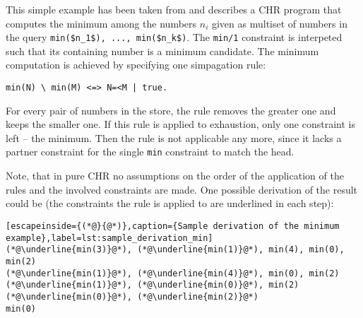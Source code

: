 \begin{example}[Minimum]
\label{ex:minimum}

This simple example has been taken from \cite[19\psqq]{fru_chr_book_2009} and describes a CHR program that computes the minimum among the numbers $n_i$ given as multiset of numbers in the query \lstinline[mathescape]|min($n_1$), ..., min($n_k$)|. The \lstinline|min/1| constraint is interpeted such that its containing number is a minimum candidate. The minimum computation is achieved by specifying one simpagation rule:

\begin{lstlisting}[caption={Minimum program}]
min(N) \ min(M) <=> N=<M | true.
\end{lstlisting}

For every pair of numbers in the store, the rule removes the greater one and keeps the smaller one. If this rule is applied to exhaustion, only one constraint is left -- the minimum. Then the rule is not applicable any more, since it lacks a partner constraint for the single \lstinline|min| constraint to match the head.

Note, that in pure CHR no assumptions on the order of the application of the rules and the involved constraints are made. One possible derivation of the result could be (the constraints the rule is applied to are underlined in each step):

\begin{lstlisting}[escapeinside={(*@}{@*)},caption={Sample derivation of the minimum example},label=lst:sample_derivation_min]
(*@\underline{min(3)}@*), (*@\underline{min(1)}@*), min(4), min(0), min(2)
(*@\underline{min(1)}@*), (*@\underline{min(4)}@*), min(0), min(2)
(*@\underline{min(1)}@*), (*@\underline{min(0)}@*), min(2)
(*@\underline{min(0)}@*), (*@\underline{min(2)}@*)
min(0)
\end{lstlisting}
\end{example}


